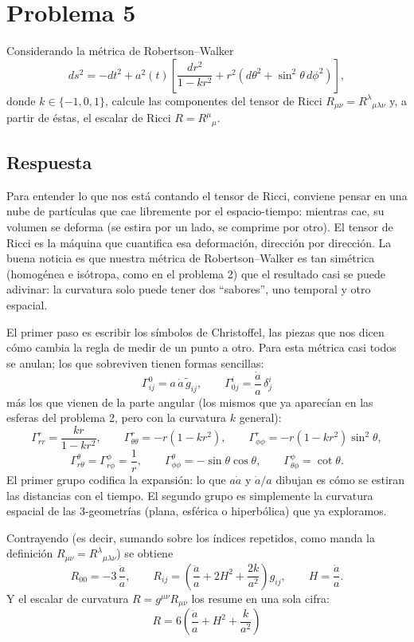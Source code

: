 \documentclass[11pt,a4paper]{article}
\begin{document}
\section*{Problema 5}
Considerando la métrica de Robertson--Walker
\begin{equation}
  ds^2=-dt^2+a^2(t)\left[\frac{dr^2}{1-kr^2}+r^2\left(d\theta^2+\sin^2\theta\,d\phi^2\right)\right], \label{eq:rw}
\end{equation}
donde $k\in\{-1,0,1\}$, calcule las componentes del tensor de Ricci $R_{\mu\nu}=R^{\lambda}{}_{\mu\lambda\nu}$ y, a partir de éstas, el escalar de Ricci $R=R^{\mu}{}_{\mu}$.

\subsection*{Respuesta}

Para entender lo que nos está contando el tensor de Ricci, conviene pensar en una nube de partículas que cae libremente por el espacio-tiempo: mientras cae, su volumen se deforma (se estira por un lado, se comprime por otro). El tensor de Ricci es la máquina que cuantifica esa deformación, dirección por dirección. La buena noticia es que nuestra métrica de Robertson--Walker es tan simétrica (homogénea e isótropa, como en el problema 2) que el resultado casi se puede adivinar: la curvatura solo puede tener dos ``sabores'', uno temporal y otro espacial.

El primer paso es escribir los símbolos de Christoffel, las piezas que nos dicen cómo cambia la regla de medir de un punto a otro. Para esta métrica casi todos se anulan; los que sobreviven tienen formas sencillas:
\[
\Gamma^0_{ij} = a\,\dot a\,\tilde{g}_{ij}, \qquad
\Gamma^i_{0j} = \frac{\dot a}{a}\,\delta^i_j
\]
más los que vienen de la parte angular (los mismos que ya aparecían en las esferas del problema 2, pero con la curvatura $k$ general):
\[
\Gamma^r_{rr} = \frac{kr}{1-kr^2}, \qquad
\Gamma^r_{\theta\theta} = -r(1-kr^2), \qquad
\Gamma^r_{\phi\phi} = -r(1-kr^2)\sin^2\theta,
\]
\[
\Gamma^\theta_{r\theta} = \Gamma^\phi_{r\phi} = \frac{1}{r}, \qquad
\Gamma^\theta_{\phi\phi} = -\sin\theta\cos\theta, \qquad
\Gamma^\phi_{\theta\phi} = \cot\theta.
\]
El primer grupo codifica la expansión: lo que $a\dot a$ y $\dot a/a$ dibujan es cómo se estiran las distancias con el tiempo. El segundo grupo es simplemente la curvatura espacial de las 3-geometrías (plana, esférica o hiperbólica) que ya exploramos.

Contrayendo (es decir, sumando sobre los índices repetidos, como manda la definición $R_{\mu\nu}=R^{\lambda}{}_{\mu\lambda\nu}$) se obtiene
\[
R_{00} = -3\,\frac{\ddot a}{a}, \qquad
R_{ij} = \left( \frac{\ddot a}{a} + 2H^2 + \frac{2k}{a^2} \right) g_{ij}, \qquad H=\frac{\dot a}{a}.
\]
Y el escalar de curvatura $R=g^{\mu\nu}R_{\mu\nu}$ los resume en una sola cifra:
\[
\boxed{R = 6\left( \frac{\ddot a}{a} + H^2 + \frac{k}{a^2} \right)}
\]
\end{document}

